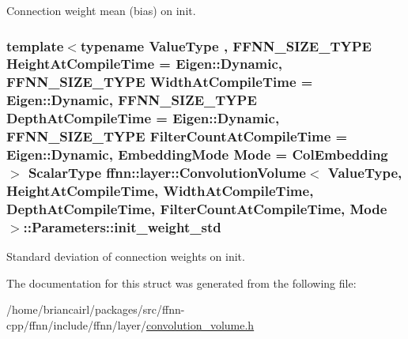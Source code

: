 Connection weight mean (bias) on init. 

\hypertarget{structffnn_1_1layer_1_1_convolution_volume_1_1_parameters_a39653215150d3d33ec8914737509e7c2}{
\subsubsection[{init\-\_\-weight\-\_\-std}]{\setlength{\rightskip}{0pt plus 5cm}template$<$typename Value\-Type , F\-F\-N\-N\-\_\-\-S\-I\-Z\-E\-\_\-\-T\-Y\-P\-E Height\-At\-Compile\-Time = Eigen\-::\-Dynamic, F\-F\-N\-N\-\_\-\-S\-I\-Z\-E\-\_\-\-T\-Y\-P\-E Width\-At\-Compile\-Time = Eigen\-::\-Dynamic, F\-F\-N\-N\-\_\-\-S\-I\-Z\-E\-\_\-\-T\-Y\-P\-E Depth\-At\-Compile\-Time = Eigen\-::\-Dynamic, F\-F\-N\-N\-\_\-\-S\-I\-Z\-E\-\_\-\-T\-Y\-P\-E Filter\-Count\-At\-Compile\-Time = Eigen\-::\-Dynamic, Embedding\-Mode Mode = Col\-Embedding$>$ {\bf Scalar\-Type} {\bf ffnn\-::layer\-::\-Convolution\-Volume}$<$ Value\-Type, Height\-At\-Compile\-Time, Width\-At\-Compile\-Time, Depth\-At\-Compile\-Time, Filter\-Count\-At\-Compile\-Time, Mode $>$\-::Parameters\-::init\-\_\-weight\-\_\-std}}\label{structffnn_1_1layer_1_1_convolution_volume_1_1_parameters_a39653215150d3d33ec8914737509e7c2}


Standard deviation of connection weights on init. 



The documentation for this struct was generated from the following file\-:\begin{DoxyCompactItemize}
\item 
/home/briancairl/packages/src/ffnn-\/cpp/ffnn/include/ffnn/layer/\hyperlink{convolution__volume_8h}{convolution\-\_\-volume.\-h}\end{DoxyCompactItemize}
